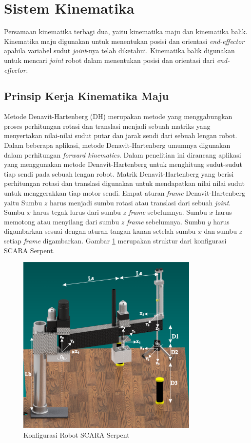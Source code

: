 \section{Sistem Kinematika}
Persamaan kinematika terbagi dua, yaitu kinematika maju dan kinematika balik. Kinematika maju digunakan untuk menentukan posisi dan orientasi \textit{end-effector} apabila variabel sudut \textit{joint}-nya telah diketahui. Kinematika balik digunakan untuk mencari \textit{joint} robot dalam menentukan posisi dan orientasi dari \textit{end-effector.}
\subsection{Prinsip Kerja Kinematika Maju}
	Metode Denavit-Hartenberg (DH) merupakan metode yang menggabungkan proses perhitungan rotasi dan translasi menjadi sebuah matriks yang menyertakan nilai-nilai sudut putar dan jarak sendi dari sebuah lengan robot. Dalam beberapa aplikasi, metode Denavit-Hartenberg umumnya digunakan dalam perhitungan \textit{forward kinematics}. Dalam penelitian ini dirancang aplikasi yang menggunakan metode Denavit-Hartenberg untuk menghitung sudut-sudut tiap sendi pada sebuah lengan robot. Matrik Denavit-Hartenberg yang berisi perhitungan rotasi dan translasi digunakan untuk mendapatkan nilai nilai sudut untuk menggerakkan tiap motor sendi. Empat aturan \textit{frame} Denavit-Hartenberg yaitu Sumbu $z$ harus menjadi sumbu rotasi atau translasi dari sebuah \textit{joint}. Sumbu $x$ harus tegak lurus dari sumbu $z$ \textit{frame} sebelumnya. Sumbu $x$ harus memotong atau menyilang dari sumbu $z$ \textit{frame} sebelumnya. Sumbu $y$ harus digambarkan sesuai dengan aturan tangan kanan setelah sumbu $x$   dan sumbu $z$ setiap \textit{frame} digambarkan. Gambar \ref{dhSCARA} merupakan struktur dari konfigurasi SCARA Serpent.
\begin{figure}[H]
	\centering
	\includegraphics[width=9cm ]{gambar/SCARAdh.png}
	\caption{Konfigurasi Robot SCARA Serpent}
	\label{dhSCARA}
\end{figure}
